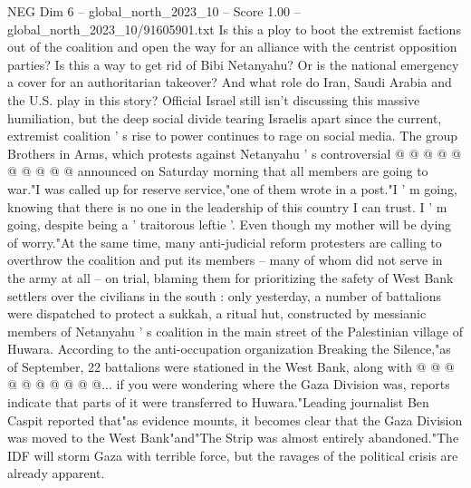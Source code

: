 \begin{textsample}{NEG Dim 6 – global\_north\_2023\_10 – Score 1.00 – global\_north\_2023\_10/91605901.txt}
Is this a ploy to boot the extremist factions out of the coalition and open the way for an alliance with the centrist opposition parties?
Is this a way to get rid of Bibi Netanyahu?
Or is the national emergency a cover for an authoritarian takeover?
And what role do Iran, Saudi Arabia and the U.S. play in this story?
Official Israel still isn't discussing this massive humiliation, but the deep social divide tearing Israelis apart since the current, extremist coalition ' s rise to power continues to rage on social media.
The group Brothers in Arms, which protests against Netanyahu ' s controversial @ @ @ @ @ @ @ @ @ @ announced on Saturday morning that all members are going to war."I was called up for reserve service,"one of them wrote in a post."I ' m going, knowing that there is no one in the leadership of this country I can trust.
I ' m going, despite being a ' traitorous leftie '.
Even though my mother will be dying of worry."At the same time, many anti-judicial reform protesters are calling to overthrow the coalition and put its members -- many of whom did not serve in the army at all -- on trial, blaming them for prioritizing the safety of West Bank settlers over the civilians in the south : only yesterday, a number of battalions were dispatched to protect a sukkah, a ritual hut, constructed by messianic members of Netanyahu ' s coalition in the main street of the Palestinian village of Huwara.
According to the anti-occupation organization Breaking the Silence,"as of September, 22 battalions were stationed in the West Bank, along with @ @ @ @ @ @ @ @ @ @... if you were wondering where the Gaza Division was, reports indicate that parts of it were transferred to Huwara."Leading journalist Ben Caspit reported that"as evidence mounts, it becomes clear that the Gaza Division was moved to the West Bank"and"The Strip was almost entirely abandoned."The IDF will storm Gaza with terrible force, but the ravages of the political crisis are already apparent.

\end{textsample}
